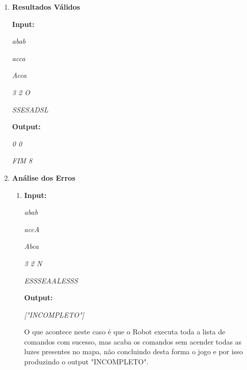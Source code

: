 \documentclass[a4paper, 12pt, portuguese]{article}
\begin{document}
\begin{enumerate}

\vspace{1 mm}

\item\textbf{Resultados Válidos}

\textbf{Input:}

\vspace{2 mm}

\textit{abab}

\textit{acca}

\textit{Acca}

\textit{3 2 O}

\textit{SSESADSL}

\vspace{2 mm}

\textbf{Output:}

\vspace{2 mm}

\textit{0 0}

\textit{FIM 8}

\vspace{2 mm}

\item\textbf{Análise dos Erros}
\begin{enumerate}

\item

\textbf{Input:}

\vspace{2 mm}

\textit{abab}

\textit{accA}

\textit{Abca}

\textit{3 2 N}

\textit{ESSSEAALESSS}

\vspace{2 mm}

\textbf{Output:}

\vspace{2 mm}

\textit{["INCOMPLETO"]}

\vspace{4 mm}

O que acontece neste caso é que o Robot executa toda a lista de comandos com sucesso, mas acaba os comandos sem acender todas as luzes presentes no mapa, não concluindo desta forma o jogo e por isso produzindo o output "INCOMPLETO".

\vspace{2 mm}

\end{enumerate}
\end{enumerate}
\end{document}
